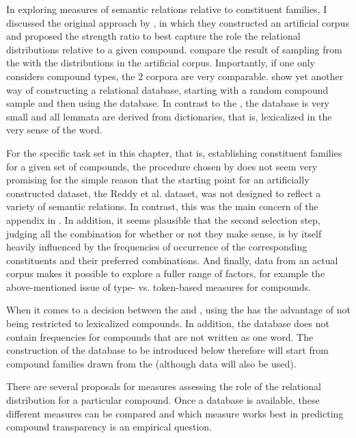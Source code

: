 In exploring measures of semantic
relations relative to constituent families, I discussed the original approach by
\citet{GagneandShoben:1997}, in which they constructed an artificial
corpus and proposed the strength ratio to best capture the role the
relational distributions relative to a given
compound. \citet{Maguireetal:2007} compare the result of sampling from
the  with the distributions in the artificial
corpus. Importantly, if one only considers compound types, the 2 
corpora are very comparable. 
\citet{PhamandBaayen:2013} show yet another
way of constructing a relational database, starting with a random
compound sample and then using the  database. In contrast to the
, the  database is very small and all lemmata are derived from
dictionaries, that is, lexicalized in the very sense of the word. 

For the specific task set in this chapter, that is, establishing
constituent families for a given set of compounds, the procedure
chosen by \citet{GagneandShoben:1997} does not seem very promising for
the simple reason that the starting point for an artificially
constructed dataset, the Reddy et al. dataset, was not designed to
reflect a variety of semantic relations. In contrast, this was the
main concern of the appendix
in \citet{Levi:1978}. In addition, it seems plausible that the second
selection step, judging all the combination for whether or not they
make sense, is by itself heavily influenced by the frequencies of
occurrence of the corresponding constituents and their preferred
combinations.  And finally, data from an actual corpus makes it
possible to explore a fuller range of factors, for example the
above-mentioned issue of type- vs. token-based measures for compounds.

When it comes to a decision between the  and , using the 
has the advantage of not being restricted to lexicalized
compounds. 
In addition, the  database does not contain
frequencies for compounds that are not written as one word. 
The construction
of the database
to be introduced below therefore will start from compound families
drawn from the  (although  data will also be used).

There are several proposals for measures
assessing the role of the
relational distribution for a particular compound. Once a
 database is available, these different measures can be compared and which measure works best in predicting compound
 transparency is an empirical question. 

